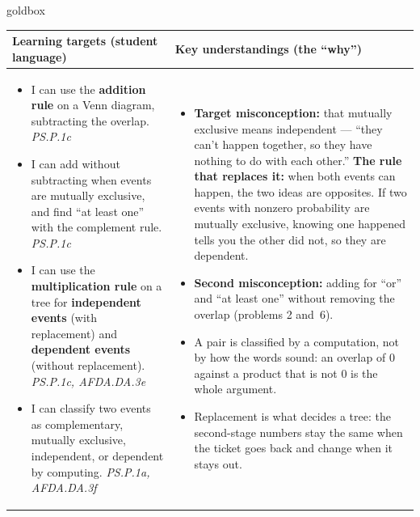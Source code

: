 \documentclass[10pt]{article}
\begin{document}
\renewcommand{\arraystretch}{1.4}
\boxguard
\begin{skillbox}{goldbox}
\begin{tabularx}{\linewidth}{@{}X|X@{}}
\textbf{Learning targets (student language)} & \textbf{Key understandings (the ``why'')} \\[2pt]
\hline
\vspace{-6pt}
\begin{itemize}[leftmargin=1.1em, nosep, after=\vspace{2pt}]
  \item I can use the \textbf{addition rule} on a Venn diagram, subtracting the overlap.
        \hfill \textit{PS.P.1c}
  \item I can add without subtracting when events are mutually exclusive, and find ``at least
        one'' with the complement rule. \hfill \textit{PS.P.1c}
  \item I can use the \textbf{multiplication rule} on a tree for \textbf{independent events}
        (with replacement) and \textbf{dependent events} (without replacement).
        \hfill \textit{PS.P.1c, AFDA.DA.3e}
  \item I can classify two events as complementary, mutually exclusive, independent, or
        dependent by computing. \hfill \textit{PS.P.1a, AFDA.DA.3f}
\end{itemize}
&
\vspace{-6pt}
\begin{itemize}[leftmargin=1.1em, nosep, after=\vspace{2pt}]
  \item \textbf{Target misconception:} that mutually exclusive means independent --- ``they
        can't happen together, so they have nothing to do with each other.'' \textbf{The rule
        that replaces it:} when both events can happen, the two ideas are opposites. If two
        events with nonzero probability are mutually exclusive, knowing one happened tells you
        the other did not, so they are dependent.
  \item \textbf{Second misconception:} adding for ``or'' and ``at least one'' without removing
        the overlap (problems 2 and~6).
  \item A pair is classified by a computation, not by how the words sound: an overlap of $0$
        against a product that is not $0$ is the whole argument.
  \item Replacement is what decides a tree: the second-stage numbers stay the same when the
        ticket goes back and change when it stays out.
\end{itemize}
\end{tabularx}
\end{skillbox}
\end{document}
